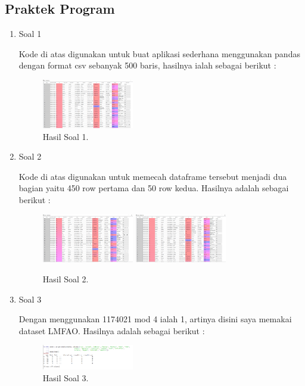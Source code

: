 \subsection{Praktek Program}
\begin{enumerate}
	\item Soal 1
	\hfill\break
	
	Kode di atas digunakan untuk buat aplikasi sederhana menggunakan pandas dengan format csv sebanyak 500 baris, hasilnya ialah sebagai berikut : 
	\begin{figure}[H]
	\centering
		\includegraphics[width=4cm]{figures/1174021/tugas4/materi/hasil1.PNG}
		\caption{Hasil Soal 1.}
	\end{figure}

	\item Soal 2
	\hfill\break
	
	Kode di atas digunakan untuk memecah dataframe tersebut menjadi dua bagian yaitu 450 row pertama dan 50 row kedua. Hasilnya adalah sebagai berikut :
	\begin{figure}[H]
	\centering
		\includegraphics[width=4cm]{figures/1174021/tugas4/materi/hasil21.PNG}
		\includegraphics[width=4cm]{figures/1174021/tugas4/materi/hasil22.PNG}
		\caption{Hasil Soal 2.}
	\end{figure}
	
	\item Soal 3
	\hfill\break
	
	Dengan menggunakan 1174021 mod 4 ialah 1, artinya disini saya memakai dataset LMFAO. Hasilnya adalah sebagai berikut :
	\begin{figure}[H]
	\centering
		\includegraphics[width=4cm]{figures/1174021/tugas2/materi/hasil3.PNG}
		\caption{Hasil Soal 3.}
	\end{figure}


\end{enumerate}
